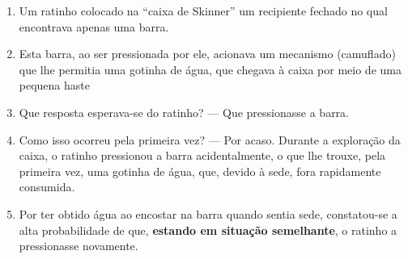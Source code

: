 \documentclass[
]{book}
\providecommand{\tightlist}{%
  \setlength{\itemsep}{0pt}\setlength{\parskip}{0pt}}
\begin{document}
\begin{enumerate}
\def\labelenumi{\arabic{enumi}.}
\tightlist
\item
  Um ratinho colocado na ``caixa de Skinner'' um recipiente fechado no qual encontrava apenas uma barra.
\item
  Esta barra, ao ser pressionada por ele, acionava um mecanismo (camuflado) que lhe permitia uma gotinha de água, que chegava à caixa por meio de uma pequena haste
\item
  Que resposta esperava-se do ratinho? --- Que pressionasse a barra.
\item
  Como isso ocorreu pela primeira vez? --- Por acaso. Durante a exploração da caixa, o ratinho pressionou a barra acidentalmente, o que lhe trouxe, pela primeira vez, uma gotinha de água, que, devido à sede, fora rapidamente consumida.
\item
  Por ter obtido água ao encostar na barra quando sentia sede, constatou-se a alta probabilidade de que, \textbf{estando em situação semelhante}, o ratinho a pressionasse novamente.
\end{enumerate}
\end{document}
